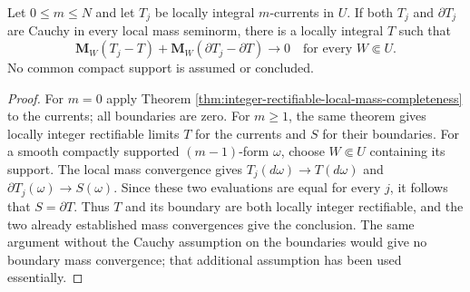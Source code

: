 \begin{corollary}\label{cor:integral-current-local-normal-completeness}
Let $0\leq m\leq N$ and let $T_j$ be locally integral $m$-currents in $U$. If both $T_j$ and $\partial T_j$ are Cauchy in every local mass seminorm, there is a locally integral $T$ such that
\[
 \mathbf M_W(T_j-T)+\mathbf M_W(\partial T_j-\partial T)\longrightarrow0
 \quad\text{for every }W\Subset U.
\]
No common compact support is assumed or concluded.
\end{corollary}
\begin{proof}
For $m=0$ apply Theorem \ref{thm:integer-rectifiable-local-mass-completeness} to the currents; all boundaries are zero. For $m\geq1$, the same theorem gives locally integer rectifiable limits $T$ for the currents and $S$ for their boundaries. For a smooth compactly supported $(m-1)$-form $\omega$, choose $W\Subset U$ containing its support. The local mass convergence gives $T_j(d\omega)\to T(d\omega)$ and $\partial T_j(\omega)\to S(\omega)$. Since these two evaluations are equal for every $j$, it follows that $S=\partial T$. Thus $T$ and its boundary are both locally integer rectifiable, and the two already established mass convergences give the conclusion. The same argument without the Cauchy assumption on the boundaries would give no boundary mass convergence; that additional assumption has been used essentially.
\end{proof}
